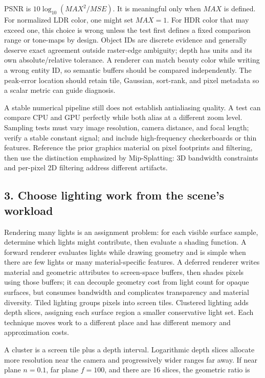 PSNR is \(10\log_{10}(MAX^2/MSE)\). It is meaningful only when \(MAX\) is defined. For normalized LDR color, one might set \(MAX=1\). For HDR color that may exceed one, this choice is wrong unless the test first defines a fixed comparison range or tone-maps by design. Object IDs are discrete evidence and generally deserve exact agreement outside raster-edge ambiguity; depth has units and its own absolute/relative tolerance. A renderer can match beauty color while writing a wrong entity ID, so semantic buffers should be compared independently. The peak-error location should retain tile, Gaussian, sort-rank, and pixel metadata so a scalar metric can guide diagnosis.

A stable numerical pipeline still does not establish antialiasing quality. A test can compare CPU and GPU perfectly while both alias at a different zoom level. Sampling tests must vary image resolution, camera distance, and focal length; verify a stable constant signal; and include high-frequency checkerboards or thin features. Reference the prior graphics material on pixel footprints and filtering, then use the distinction emphasized by Mip-Splatting: 3D bandwidth constraints and per-pixel 2D filtering address different artifacts.

\subsection{3. Choose lighting work from the scene's workload}\label{04-visual-computing-ii-ch037-choose-lighting-work-from-the-scenes-workload}

Rendering many lights is an assignment problem: for each visible surface sample, determine which lights might contribute, then evaluate a shading function. A forward renderer evaluates lights while drawing geometry and is simple when there are few lights or many material-specific features. A deferred renderer writes material and geometric attributes to screen-space buffers, then shades pixels using those buffers; it can decouple geometry cost from light count for opaque surfaces, but consumes bandwidth and complicates transparency and material diversity. Tiled lighting groups pixels into screen tiles. Clustered lighting adds depth slices, assigning each surface region a smaller conservative light set. Each technique moves work to a different place and has different memory and approximation costs.

A cluster is a screen tile plus a depth interval. Logarithmic depth slices allocate more resolution near the camera and progressively wider ranges far away. If near plane \(n=0.1\), far plane \(f=100\), and there are 16 slices, the geometric ratio is

